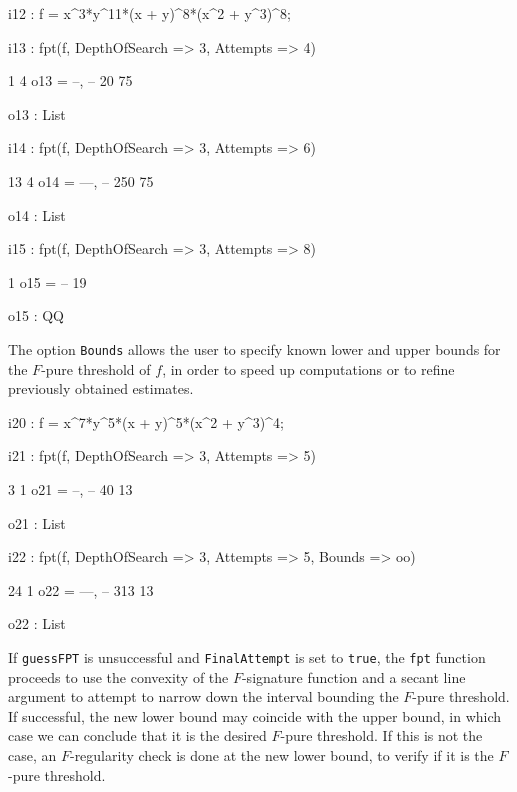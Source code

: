 \documentclass{amsart}
\begin{document}
\medskip
{\small
{}
\begin{MyVerbatim}
i12 : f = x^3*y^11*(x + y)^8*(x^2 + y^3)^8;

i13 : fpt(f, DepthOfSearch => 3, Attempts => 4)

        1   4
o13 = {--, --}
       20  75

o13 : List

i14 : fpt(f, DepthOfSearch => 3, Attempts => 6)

        13   4
o14 = {---, --}
       250  75

o14 : List

i15 : fpt(f, DepthOfSearch => 3, Attempts => 8) 

       1
o15 = --
      19

o15 : QQ
\end{MyVerbatim}
}
\medskip


The option \texttt{Bounds} allows the user to specify known lower and upper bounds for the $F$-pure threshold of $f$, in order to speed up computations or to refine previously obtained estimates.

\medskip
{\small
{}
\begin{MyVerbatim}
i20 : f = x^7*y^5*(x + y)^5*(x^2 + y^3)^4;

i21 : fpt(f, DepthOfSearch => 3, Attempts => 5)

        3   1
o21 = {--, --}
       40  13

o21 : List

i22 : fpt(f, DepthOfSearch => 3, Attempts => 5, Bounds => oo)

        24   1
o22 = {---, --}
       313  13

o22 : List
\end{MyVerbatim}
}
\medskip


If \texttt{guessFPT} is unsuccessful and \texttt{FinalAttempt} is set to \texttt{true}, the \texttt{fpt} function proceeds to use the convexity of the $F$-signature function and a secant line argument to attempt to narrow down the interval bounding the $F$-pure threshold.
If successful, the new lower bound may coincide with the upper bound, in which case we can conclude that it is the desired $F$-pure threshold.
If this is not the case, an $F$-regularity check is done at the new lower bound, to verify if it is the $F$-pure threshold.
\end{document}
